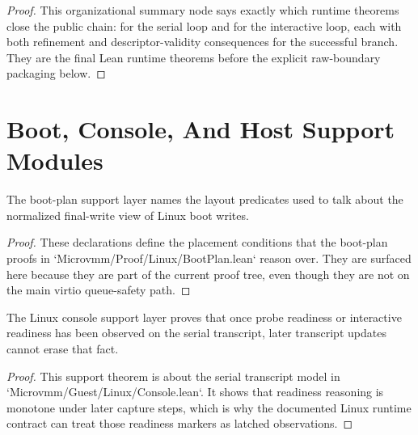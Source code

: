 \begin{proof}
\leanok
{}
This organizational summary node says exactly which runtime theorems close the public chain:  for the serial loop and  for the interactive loop, each with both refinement and descriptor-validity consequences for the successful branch.
They are the final Lean runtime theorems before the explicit raw-boundary packaging below.
\end{proof}

\section{Boot, Console, And Host Support Modules}

\begin{theorem}
\label{thm:linux-boot-layout}
\leanok
The boot-plan support layer names the layout predicates used to talk about the normalized final-write view of Linux boot writes.
\end{theorem}

\begin{proof}
\leanok
These declarations define the placement conditions that the boot-plan proofs in `Microvmm/Proof/Linux/BootPlan.lean` reason over.
They are surfaced here because they are part of the current proof tree, even though they are not on the main virtio queue-safety path.
\end{proof}

\begin{theorem}
\label{thm:linux-console-readiness}
\leanok
The Linux console support layer proves that once probe readiness or interactive readiness has been observed on the serial transcript, later transcript updates cannot erase that fact.
\end{theorem}

\begin{proof}
\leanok
This support theorem is about the serial transcript model in `Microvmm/Guest/Linux/Console.lean`.
It shows that readiness reasoning is monotone under later capture steps, which is why the documented Linux runtime contract can treat those readiness markers as latched observations.
\end{proof}

